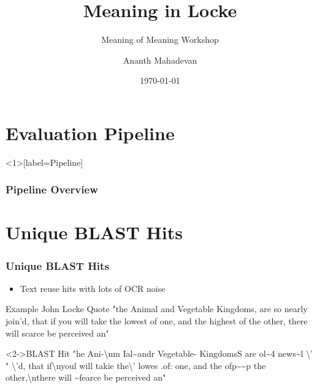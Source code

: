 \documentclass[pdf]{beamer}
\title{Meaning in Locke}
\subtitle[]{Meaning of Meaning Workshop}
\author{Ananth Mahadevan}
\date{\today}
\begin{document}
\begin{frame}
    \titlepage
\end{frame}



\section{Evaluation Pipeline}

\begin{frame}<1>[label=Pipeline]
  \frametitle{Pipeline Overview}
  
\end{frame}



\section{Unique BLAST Hits}
\begin{frame}
  \frametitle{Unique BLAST Hits}

  \begin{itemize}
    \item Text reuse hits with lots of OCR noise
  \end{itemize}
  \begin{block}{Example John Locke Quote}
    "the Animal and Vegetable Kingdoms, are so nearly join'd, that if you will take the lowest of one, and the highest of the other, there will scarce be perceived an"
  \end{block}

  \begin{block}<2->{BLAST Hit}
    "he Ani-\textbackslash{}nm Ial\textasciitilde{}andr Vegetable- KingdomsS are \textbraceleft{}ol\textasciitilde{}4 news\textasciitilde{}l \textbackslash{}' " \textbackslash{}'d, that if\textbackslash{}nyoul will takie the\textbackslash{}' lowes .of: one, and the ofp\textasciitilde{}\textasciitilde{}p the other,\textbackslash{}nthere will \textasciitilde{}fearce be perceived an"
  \end{block}

\end{frame}
\end{document}

